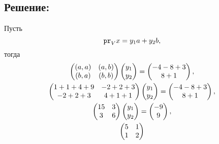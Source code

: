 \documentclass[12pt]{article}
\begin{document}
    \subsection*{Решение:}
    Пусть
    \[
        \texttt{pr}_{V} {x} = y_1 a + y_2 b,
    \]
    тогда
    \begin{gather*}
        \begin{pmatrix}
            \left ( a, a \right ) & \left ( a, b \right ) \\
            \left ( b, a \right ) & \left ( b, b \right )
        \end{pmatrix}
        \begin{pmatrix}
            y_1 \\
            y_2
        \end{pmatrix}
        =
        \begin{pmatrix}
            -4 - 8 + 3 \\
            8 + 1
        \end{pmatrix}, \\
        \begin{pmatrix}
            1 + 1 + 4 + 9 & -2 + 2 + 3 \\
            -2 + 2 + 3    & 4 + 1 + 1
        \end{pmatrix}
        \begin{pmatrix}
            y_1 \\
            y_2
        \end{pmatrix}
        =
        \begin{pmatrix}
            -4 - 8 + 3 \\
            8 + 1
        \end{pmatrix}, \\
        \begin{pmatrix}
            15 & 3 \\
            3  & 6
        \end{pmatrix}
        \begin{pmatrix}
            y_1 \\
            y_2
        \end{pmatrix}
        =
        \begin{pmatrix}
            -9 \\
            9
        \end{pmatrix}, \\
        \begin{pmatrix}
            5 & 1 \\
            1 & 2

\end{pmatrix}
\end{gather*}
\end{document}
